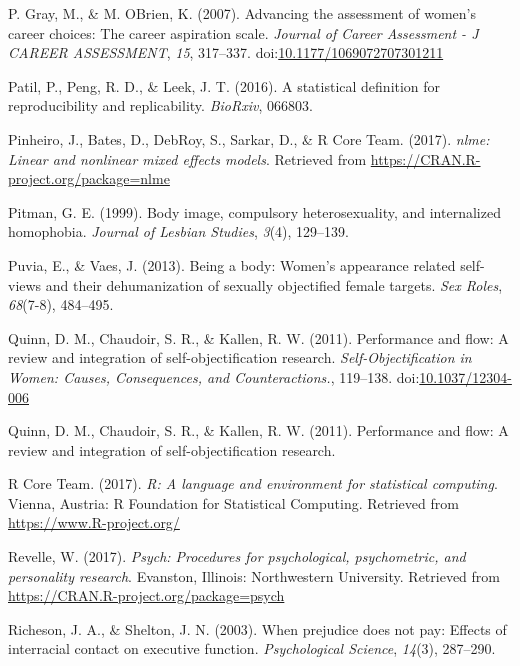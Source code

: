 \documentclass[man]{apa6}
\begin{document}
\hypertarget{ref-grayobrien2007}{}
P. Gray, M., \& M. OBrien, K. (2007). Advancing the assessment of
women's career choices: The career aspiration scale. \emph{Journal of
Career Assessment - J CAREER ASSESSMENT}, \emph{15}, 317--337.
doi:\href{https://doi.org/10.1177/1069072707301211}{10.1177/1069072707301211}

\hypertarget{ref-patil2016statistical}{}
Patil, P., Peng, R. D., \& Leek, J. T. (2016). A statistical definition
for reproducibility and replicability. \emph{BioRxiv}, 066803.

\hypertarget{ref-R-nlme}{}
Pinheiro, J., Bates, D., DebRoy, S., Sarkar, D., \& R Core Team. (2017).
\emph{nlme: Linear and nonlinear mixed effects models}. Retrieved from
\url{https://CRAN.R-project.org/package=nlme}

\hypertarget{ref-pitman1999body}{}
Pitman, G. E. (1999). Body image, compulsory heterosexuality, and
internalized homophobia. \emph{Journal of Lesbian Studies}, \emph{3}(4),
129--139.

\hypertarget{ref-puvia2013being}{}
Puvia, E., \& Vaes, J. (2013). Being a body: Women's appearance related
self-views and their dehumanization of sexually objectified female
targets. \emph{Sex Roles}, \emph{68}(7-8), 484--495.

\hypertarget{ref-quinnetal}{}
Quinn, D. M., Chaudoir, S. R., \& Kallen, R. W. (2011). Performance and
flow: A review and integration of self-objectification research.
\emph{Self-Objectification in Women: Causes, Consequences, and
Counteractions.}, 119--138.
doi:\href{https://doi.org/10.1037/12304-006}{10.1037/12304-006}

\hypertarget{ref-quinn2011performance}{}
Quinn, D. M., Chaudoir, S. R., \& Kallen, R. W. (2011). Performance and
flow: A review and integration of self-objectification research.

\hypertarget{ref-R-base}{}
R Core Team. (2017). \emph{R: A language and environment for statistical
computing}. Vienna, Austria: R Foundation for Statistical Computing.
Retrieved from \url{https://www.R-project.org/}

\hypertarget{ref-R-psych}{}
Revelle, W. (2017). \emph{Psych: Procedures for psychological,
psychometric, and personality research}. Evanston, Illinois:
Northwestern University. Retrieved from
\url{https://CRAN.R-project.org/package=psych}

\hypertarget{ref-richeson2003prejudice}{}
Richeson, J. A., \& Shelton, J. N. (2003). When prejudice does not pay:
Effects of interracial contact on executive function.
\emph{Psychological Science}, \emph{14}(3), 287--290.
\end{document}
